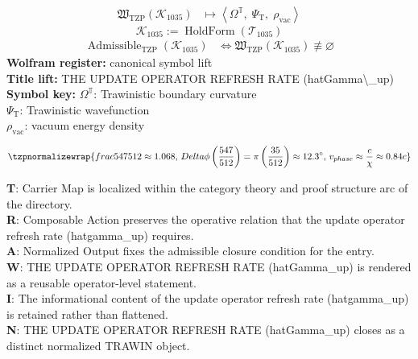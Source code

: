 \noindent
\begin{minipage}[t]{0.48\linewidth}
\begingroup
\small
\[
\begin{aligned}
\mathfrak{W}_{\mathrm{TZP}}\!\left(\mathcal{K}_{1035}\right)
&\longmapsto
\left\langle \Omega^{\mathbb{T}},\; \Psi_{\mathrm{T}},\; \rho_{\mathrm{vac}} \right\rangle
\end{aligned}
\]
\[
\mathcal{K}_{1035}
:=
\operatorname{HoldForm}\!\left(\mathcal{T}_{1035}\right)
\]
\[
\begin{aligned}
\operatorname{Admissible}_{\mathrm{TZP}}\!\left(\mathcal{K}_{1035}\right)
&\Longleftrightarrow
\mathfrak{W}_{\mathrm{TZP}}\!\left(\mathcal{K}_{1035}\right)\not\equiv\varnothing
\end{aligned}
\]
\textbf{Wolfram register:} canonical symbol lift\\
\textbf{Title lift:} THE UPDATE OPERATOR REFRESH RATE (hatGamma\textbackslash{}\_up)\\
\textbf{Symbol key:} \(\Omega^{\mathbb{T}}\): Trawinistic boundary curvature\\ \(\Psi_{\mathrm{T}}\): Trawinistic wavefunction\\ \(\rho_{\mathrm{vac}}\): vacuum energy density
\par
\endgroup
\end{minipage}\hfill
\begin{minipage}[t]{0.48\linewidth}
\[
\tzpnormalizewrap{frac{547}{512} \approx 1.068,\,Delta\phi\left(\frac{547}{512}\right) = \pi\left(\frac{35}{512}\right) \approx 12.3^\circ,\,v_{phase} \approx \frac{c}{\chi} \approx 0.84c}
\]

\small
\textbf{T}: Carrier Map is localized within the category theory and proof structure arc of the directory.\\
\textbf{R}: Composable Action preserves the operative relation that the update operator refresh rate (hatgamma\_up) requires.\\
\textbf{A}: Normalized Output fixes the admissible closure condition for the entry.\\
\textbf{W}: THE UPDATE OPERATOR REFRESH RATE (hatGamma\_up) is rendered as a reusable operator-level statement.\\
\textbf{I}: The informational content of the update operator refresh rate (hatgamma\_up) is retained rather than flattened.\\
\textbf{N}: THE UPDATE OPERATOR REFRESH RATE (hatGamma\_up) closes as a distinct normalized TRAWIN object.
\normalsize
\end{minipage}

